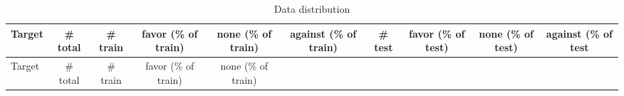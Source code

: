 \documentclass[]{article}
\begin{document}
\begin{longtable}[]{@{}lccccccccc@{}}
\caption{\label{fig:data_dst} Data distribution}\tabularnewline
\toprule
\begin{minipage}[b]{0.15\columnwidth}\raggedright
Target\strut
\end{minipage} & \begin{minipage}[b]{0.07\columnwidth}\centering
\# total\strut
\end{minipage} & \begin{minipage}[b]{0.07\columnwidth}\centering
\# train\strut
\end{minipage} & \begin{minipage}[b]{0.07\columnwidth}\centering
favor (\% of train)\strut
\end{minipage} & \begin{minipage}[b]{0.07\columnwidth}\centering
none (\% of train)\strut
\end{minipage} & \begin{minipage}[b]{0.07\columnwidth}\centering
against (\% of train)\strut
\end{minipage} & \begin{minipage}[b]{0.07\columnwidth}\centering
\# test\strut
\end{minipage} & \begin{minipage}[b]{0.07\columnwidth}\centering
favor (\% of test)\strut
\end{minipage} & \begin{minipage}[b]{0.07\columnwidth}\centering
none (\% of test)\strut
\end{minipage} & \begin{minipage}[b]{0.07\columnwidth}\centering
against (\% of test\strut
\end{minipage}\tabularnewline
\midrule
\endfirsthead
\toprule
\begin{minipage}[b]{0.15\columnwidth}\raggedright
Target\strut
\end{minipage} & \begin{minipage}[b]{0.07\columnwidth}\centering
\# total\strut
\end{minipage} & \begin{minipage}[b]{0.07\columnwidth}\centering
\# train\strut
\end{minipage} & \begin{minipage}[b]{0.07\columnwidth}\centering
favor (\% of train)\strut
\end{minipage} & \begin{minipage}[b]{0.07\columnwidth}\centering
none (\% of train)\strut

\end{minipage}
\end{longtable}
\end{document}
